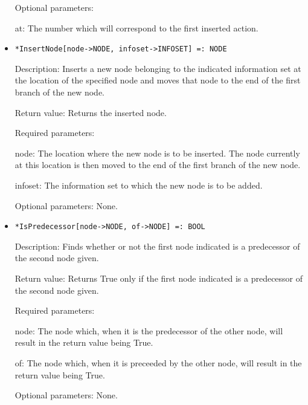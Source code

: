 \begin{itemize}
\item
[Optional parameters:]\hfill\null
\bd
\item
[at:] The number which will correspond to the first inserted action.
\ed
\ed

\item
\protect \large \begin{verbatim}
*InsertNode[node->NODE, infoset->INFOSET] =: NODE
\end{verbatim}\normalsize

\bd
\item
[Description:] Inserts a new node belonging to the indicated
information set at the location of the specified node and moves that
node to the end of the first branch of the new node.
\item
[Return value:] Returns the inserted node.
\item
[Required parameters:]\hfil\null

\bd
\item
[node:] The location where the new node is to be inserted.  The node
currently at this location is then moved to the end of the first
branch of the new node.
\item
[infoset:] The information set to which the new node is to be added.  
\ed

\item
[Optional parameters:] None.
\ed

\item
\protect \large \begin{verbatim}
*IsPredecessor[node->NODE, of->NODE] =: BOOL
\end{verbatim}\normalsize

\bd
\item
[Description:] Finds whether or not the first node indicated is a
predecessor of the second node given.
\item
[Return value:] Returns True only if the first node indicated is a
predecessor of the second node given.
\item
[Required parameters:]\hfil\null

\bd
\item
[node:] The node which, when it is the predecessor of the other node,
will result in the return value being True.
\item
[of:] The node which, when it is preceeded by the other node, will
result in the return value being True.
\ed

\item
[Optional parameters:] None.
\ed


\end{itemize}

